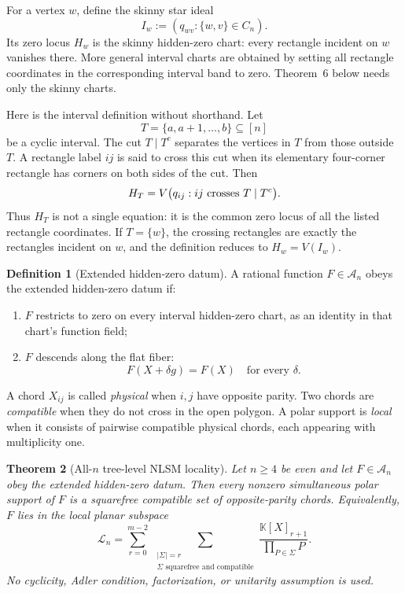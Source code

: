 \documentclass[11pt]{article}
\newtheorem{theorem}{Theorem}
\theoremstyle{definition}
\newtheorem{definition}[theorem]{Definition}
\newcommand{\K}{\mathbb K}
\begin{document}
For a vertex $w$, define the skinny star ideal
\begin{equation}
I_w:=(q_{wv}:\{w,v\}\in C_n).
\label{eq:skinny-star}
\end{equation}
Its zero locus $H_w$ is the skinny hidden-zero chart: every rectangle incident on $w$ vanishes there.  More general interval charts are obtained by setting all rectangle coordinates in the corresponding interval band to zero.  Theorem~6 below needs only the skinny charts.

Here is the interval definition without shorthand.  Let
\[
T=\{a,a+1,\ldots,b\}\subseteq[n]
\]
be a cyclic interval.  The cut $T\mid T^c$ separates the vertices in $T$
from those outside $T$.  A rectangle label $ij$ is said to cross this
cut when its elementary four-corner rectangle has corners on both sides of
the cut.  Then
\[
H_T
=V\bigl(q_{ij}:ij\hbox{ crosses }T\mid T^c\bigr).
\]
Thus $H_T$ is not a single equation: it is the common zero locus of all the
listed rectangle coordinates.  If $T=\{w\}$, the crossing rectangles are
exactly the rectangles incident on $w$, and the definition reduces to
$H_w=V(I_w)$.

\begin{definition}[Extended hidden-zero datum]
A rational function $F\in\mathcal A_n$ obeys the extended hidden-zero datum if:
\begin{enumerate}[label=\textup{(H\arabic*)}]
\item $F$ restricts to zero on every interval hidden-zero chart, as an identity in that chart's function field;
\item $F$ descends along the flat fiber:
\begin{equation}
F(X+\delta g)=F(X)
\quad\text{for every }\delta.
\label{eq:descent}
\end{equation}
\end{enumerate}
\end{definition}

A chord $X_{ij}$ is called \emph{physical} when $i,j$ have opposite parity.  Two chords are \emph{compatible} when they do not cross in the open polygon.  A polar support is \emph{local} when it consists of pairwise compatible physical chords, each appearing with multiplicity one.

\begin{theorem}[All-$n$ tree-level NLSM locality]
Let $n\ge4$ be even and let $F\in\mathcal A_n$ obey the extended hidden-zero datum.  Then every nonzero simultaneous polar support of $F$ is a squarefree compatible set of opposite-parity chords.  Equivalently, $F$ lies in the local planar subspace
\[
\mathcal L_n
=
\sum_{r=0}^{m-2}
\ \sum_{\substack{|\Sigma|=r\\
\Sigma\text{ squarefree and compatible}}}
\frac{\K[X]_{r+1}}{\prod_{P\in\Sigma}P}.
\]
No cyclicity, Adler condition, factorization, or unitarity assumption is used.
\end{theorem}
\end{document}
